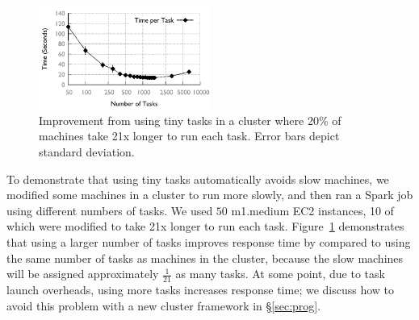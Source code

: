 \begin{figure}[!t]
\centering
\hspace{2ex}
\includegraphics[width=0.5\textwidth]{figures/spark-skew-results}
\vspace{-4ex}
\caption{Improvement from using tiny tasks in a cluster where 20\% of machines
take 21x longer to run each task. Error bars depict standard deviation.}
\vspace{-2ex}
\label{fig:sparkskew}
\end{figure}



To demonstrate that using tiny tasks automatically avoids slow machines,
we modified some machines in a cluster to run more slowly, and then
ran a Spark job using different numbers of tasks. We used $50$ m1.medium EC2
instances, 10 of which were modified to take 21x longer to run each task.
Figure~\ref{fig:sparkskew} demonstrates that using a larger number of tasks
improves response time by  compared to using the same number
of tasks as machines in the cluster, because the slow machines will be
assigned approximately $\frac{1}{21}$ as many tasks. At some point, due to
task launch overheads, using more tasks increases response time; we discuss
how to avoid this problem with a new cluster framework in \S\ref{sec:prog}.

